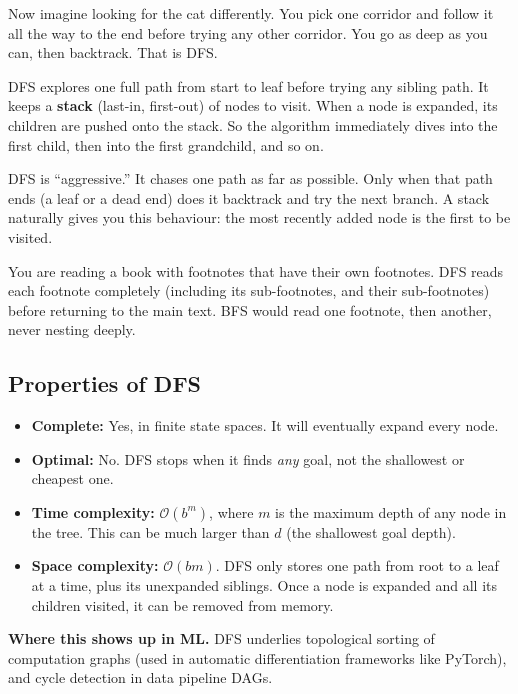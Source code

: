 \documentclass[a4paper,11pt]{article}
\newcommand{\vocab}[1]{\textbf{\color{navy}#1}}
\begin{document}
Now imagine looking for the cat differently. You pick one corridor and follow
it all the way to the end before trying any other corridor. You go as deep
as you can, then backtrack. That is DFS.

DFS explores one full path from start to leaf before trying any sibling path.
It keeps a \vocab{stack} (last-in, first-out) of nodes to visit. When a node
is expanded, its children are pushed onto the stack. So the algorithm
immediately dives into the first child, then into the first grandchild, and so
on.

\begin{intuition}
DFS is ``aggressive.'' It chases one path as far as possible. Only when that
path ends (a leaf or a dead end) does it backtrack and try the next branch. A
stack naturally gives you this behaviour: the most recently added node is the
first to be visited.
\end{intuition}

\begin{everyday}
You are reading a book with footnotes that have their own footnotes. DFS reads
each footnote completely (including its sub-footnotes, and their sub-footnotes)
before returning to the main text. BFS would read one footnote, then another,
never nesting deeply.
\end{everyday}

\subsection*{Properties of DFS}

\begin{itemize}
  \item \textbf{Complete:} Yes, in finite state spaces. It will eventually
    expand every node.
  \item \textbf{Optimal:} No. DFS stops when it finds \emph{any} goal, not
    the shallowest or cheapest one.
  \item \textbf{Time complexity:} $\mathcal{O}(b^{m})$, where $m$ is the
    maximum depth of any node in the tree. This can be much larger than $d$
    (the shallowest goal depth).
  \item \textbf{Space complexity:} $\mathcal{O}(bm)$. DFS only stores one path
    from root to a leaf at a time, plus its unexpanded siblings. Once a node
    is expanded and all its children visited, it can be removed from memory.
\end{itemize}

\noindent\textbf{Where this shows up in ML.}
DFS underlies topological sorting of computation graphs (used in automatic
differentiation frameworks like PyTorch), and cycle detection in data pipeline
DAGs.
\end{document}
